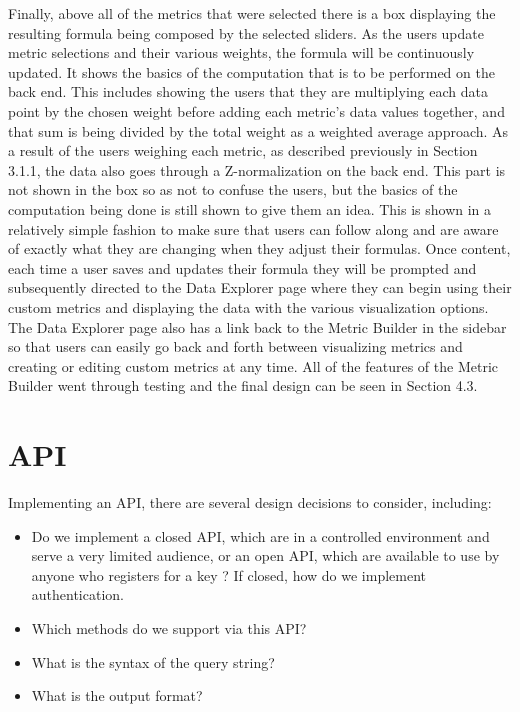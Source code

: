 			Finally, above all of the metrics that were selected there is a box displaying the resulting formula being composed by the selected sliders. As the users update metric selections and their various weights,
			the formula will be continuously updated. It shows the basics of the computation that is to be performed on the back end. This includes showing the users that they are 
			multiplying each data point by the chosen weight before adding each metric's data values together, and that sum is being divided by the total weight as a weighted average approach. 
			As a result of the users weighing each metric, as described previously in Section 3.1.1, the data also goes through a Z-normalization on the back end. This part is not shown in the box so as not to confuse the users, but the basics of the computation being done is still shown to give them an idea. 
			This is shown in a relatively simple fashion to make sure that users can follow along and are aware of exactly what they are changing when they adjust their formulas. 
			Once content, each time a user saves and updates their formula they will be prompted and subsequently directed to the Data Explorer page where they can begin using their custom metrics and displaying the data with the various visualization options. The Data Explorer page also has a link back to the Metric Builder in the sidebar so that users can easily go back and forth between visualizing metrics and creating or editing custom metrics at any time. All of the features of the Metric Builder went through testing and the final design can be seen in Section 4.3.
			

	\section{API}
			
			Implementing an API, there are several design decisions to consider, including:
			\begin{itemize}
				\item
					Do we implement a closed API, which are in a controlled environment and serve a very limited audience, or an open API, which are available to use by anyone who registers for a key \cite{openapi}? 
					If closed, how do we implement authentication. 
				\item
					Which methods do we support via this API?
				\item
			        What is the syntax of the query string? 	
				\item
				    What is the output format?
			\end{itemize}
			
